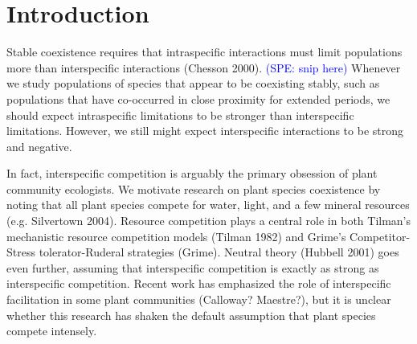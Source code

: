 \documentclass[11pt]{article}
\newcommand{\comment}{\textcolor{blue}}
\begin{document}
\begin{doublespacing}
\begin{enumerate}
\end{enumerate}


\section*{Introduction}

Stable coexistence requires that intraspecific interactions must limit populations more than interspecific interactions (Chesson 2000). 
\comment{(SPE: snip here)}
Whenever we study populations of species that appear to be coexisting stably, such as populations that have co-occurred in close proximity for extended periods, we should expect intraspecific limitations to be stronger than interspecific limitations. However, we still might expect interspecific interactions to be strong and negative. 

In fact, interspecific competition is arguably the primary obsession of plant community ecologists. We motivate research on plant species coexistence by noting that all plant species compete for water, light, and a few mineral resources (e.g. Silvertown 2004). Resource competition plays a central role in both Tilman's mechanistic resource competition models (Tilman 1982) and Grime's Competitor-Stress tolerator-Ruderal strategies (Grime). Neutral theory (Hubbell 2001) goes even further, assuming that interspecific competition is exactly as strong as interspecific competition. Recent work has emphasized the role of interspecific facilitation in some plant communities (Calloway? Maestre?), but it is unclear whether this research has shaken the default assumption that plant species compete intensely.


\end{doublespacing}
\end{document}
